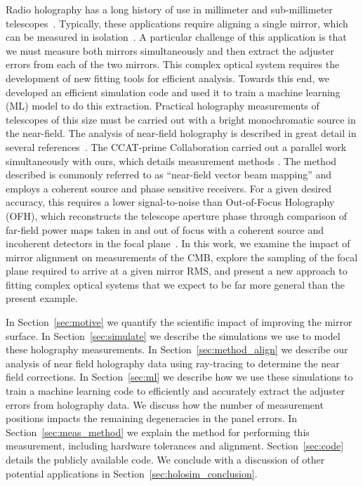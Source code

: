 Radio holography has a long history of use in millimeter and sub-millimeter telescopes~\cite{alma_holog,Sridharan,7228408,5722985,morris:1143663,Fienup:93}.  Typically, these applications require aligning a single mirror, which can be measured in isolation~\cite{1141354,Hunter2011}.  A particular challenge of this application is that we must measure both mirrors simultaneously and then extract the adjuster errors from each of the two mirrors.  This complex optical system requires the development of new fitting tools for efficient analysis.  Towards this end, we developed an efficient simulation code and used it to train a machine learning (ML) model to do this extraction.
Practical holography measurements of telescopes of this size must be carried out with a bright monochromatic source in the near-field.  The analysis of near-field holography is described in great detail in several references~\cite{alma_holog,5722985,1190}.  The CCAT-prime Collaboration carried out a parallel work simultaneously with ours, which details measurement methods \cite{fyst_holog}.  The method described is commonly referred to as “near-field vector beam mapping” and employs a coherent source and phase sensitive receivers.  For a given desired accuracy, this requires a lower signal-to-noise than Out-of-Focus Holography (OFH), which reconstructs the telescope aperture phase through comparison of far-field power maps taken in and out of focus with a coherent source and incoherent detectors in the focal plane~\cite{Serabyn:91}.  In this work, we examine the impact of mirror alignment on measurements of the CMB, explore the sampling of the focal plane required to arrive at a given mirror RMS, and  present a new approach to fitting complex optical systems that we expect to be far more general than the present example.

In Section~\ref{sec:motive} we quantify the scientific impact of improving the mirror surface.  In Section~\ref{sec:simulate} we describe the simulations we use to model these holography measurements.  In Section~\ref{sec:method_align} we describe our analysis of near field holography data using ray-tracing to determine the near field corrections.  In Section~\ref{sec:ml} we describe how we use these simulations to train a machine learning code to efficiently and accurately extract the adjuster errors from holography data.  We discuss how the number of measurement positions impacts the remaining degeneracies in the panel errors.  In Section~\ref{sec:meas_method} we explain the method for performing this measurement, including hardware tolerances and alignment.  Section~\ref{sec:code} details the publicly available code.  We conclude with a discussion of other potential applications in Section~\ref{sec:holosim_conclusion}.  
